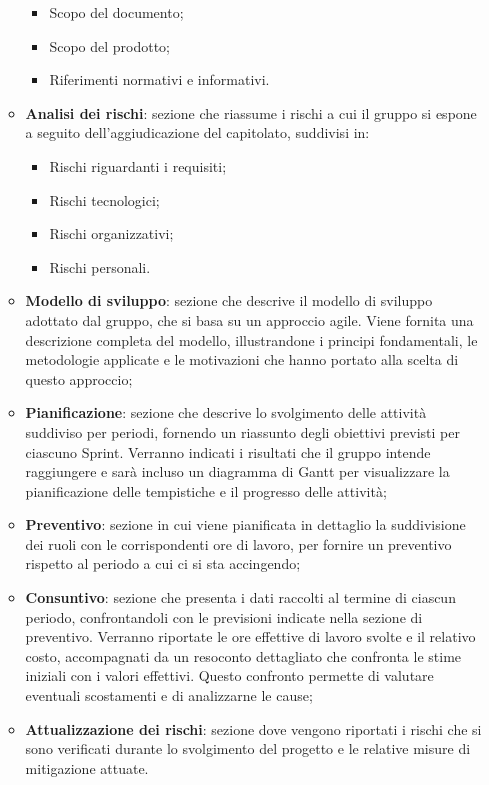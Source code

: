 \begin{itemize}
\begin{itemize}
                \begin{itemize}
                    \item Scopo del documento;
                    \item Scopo del prodotto;
                    \item Riferimenti normativi e informativi.
                \end{itemize}
                \item \textbf{Analisi dei rischi}: sezione che riassume i rischi a cui il gruppo si espone a seguito dell'aggiudicazione del capitolato, suddivisi in:
                \begin{itemize}
                    \item Rischi riguardanti i requisiti;
                    \item Rischi tecnologici;
                    \item Rischi organizzativi;
                    \item Rischi personali.
                \end{itemize}
                \item \textbf{Modello di sviluppo}: sezione che descrive il modello di sviluppo adottato dal gruppo, che si basa su un approccio agile. Viene fornita una descrizione completa del modello, illustrandone i principi fondamentali, le metodologie applicate e le motivazioni che hanno portato alla scelta di questo approccio;
                \item \textbf{Pianificazione}: sezione che descrive lo svolgimento delle attività suddiviso per periodi, fornendo un riassunto degli obiettivi previsti per ciascuno Sprint. Verranno indicati i risultati che il gruppo intende raggiungere e sarà incluso un diagramma di Gantt per visualizzare la pianificazione delle tempistiche e il progresso delle attività;
                \item \textbf{Preventivo}: sezione in cui viene pianificata in dettaglio la suddivisione dei ruoli con le corrispondenti ore di lavoro, per fornire un preventivo rispetto al periodo a cui ci si sta accingendo;
                \item \textbf{Consuntivo}: sezione che presenta i dati raccolti al termine di ciascun periodo, confrontandoli con le previsioni indicate nella sezione di preventivo. Verranno riportate le ore effettive di lavoro svolte e il relativo costo, accompagnati da un resoconto dettagliato che confronta le stime iniziali con i valori effettivi. Questo confronto permette di valutare eventuali scostamenti e di analizzarne le cause;
                \item \textbf{Attualizzazione dei rischi}: sezione dove vengono riportati i rischi che si sono verificati durante lo svolgimento del progetto e le relative misure di mitigazione attuate.
            \end{itemize}


\end{itemize}
